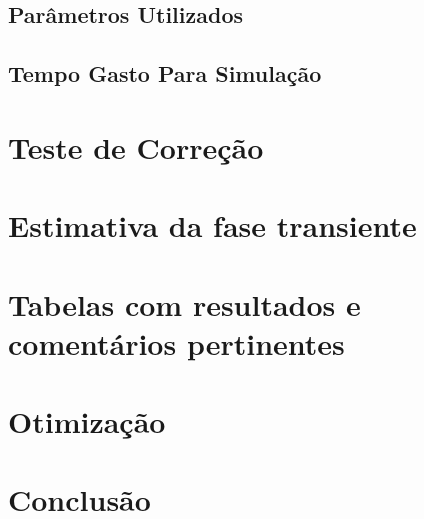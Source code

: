 \documentclass[a4paper,10pt]{article}
\begin{document}
\subsection{Parâmetros Utilizados}
\subsection{Tempo Gasto Para Simulação}

\pagebreak

\section{Teste de Correção}

\pagebreak

\section{Estimativa da fase transiente}

\pagebreak

\section{Tabelas com resultados e comentários pertinentes}

\pagebreak

\section{Otimização}

\pagebreak

\section{Conclusão}

\pagebreak
\end{document}
